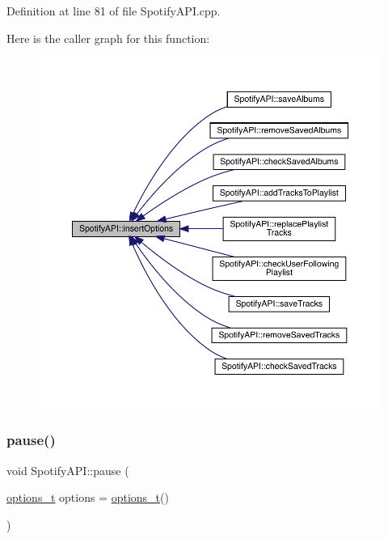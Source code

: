 Definition at line 81 of file Spotify\+A\+P\+I.\+cpp.

Here is the caller graph for this function\+:
\nopagebreak
\begin{figure}[H]
\begin{center}
\leavevmode
\includegraphics[width=350pt]{class_spotify_a_p_i_ac6e0064f7fb02813ab423f4c9f5d042e_icgraph}
\end{center}
\end{figure}
\mbox{\label{class_spotify_a_p_i_a6464fecf1265757d979ca584ff85d877}} 
\subsubsection{\texorpdfstring{pause()}{pause()}}
{\footnotesize\ttfamily void Spotify\+A\+P\+I\+::pause (\begin{DoxyParamCaption}\item[{\mbox{\hyperlink{_spotify_a_p_i_8h_a0ff5cac1a4007bb330b7d9939650c283}{options\+\_\+t}}}]{options = {\ttfamily \mbox{\hyperlink{_spotify_a_p_i_8h_a0ff5cac1a4007bb330b7d9939650c283}{options\+\_\+t}}()} }\end{DoxyParamCaption})}




